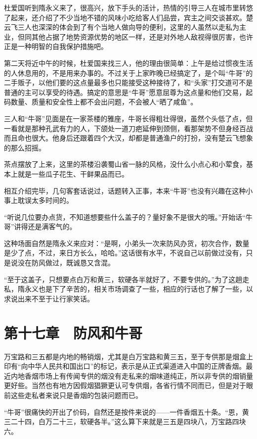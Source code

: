 杜爱国听到隋永义来了，很高兴，放下手头的活计，热情的引导三人在城市里转悠了起来，还介绍了不少当地不错的风味小吃给客人们品尝，宾主之间交谈甚欢。楚云飞三人也深深的体会到了有个当地人做向导的便利，这里的人虽然以走私为主业，但同其他占据了地势资源优势的地区一样，还是对外地人敌视得很厉害，也许正是一种明智的自我保护措施吧。

第二天将近中午的时候，杜爱国来找三人，他的理由很简单：上午是给过惯夜生活的人休息用的，不是用来办事的。不过关于上家昨晚已经搞定了，是个叫“牛哥”的二手贩子，以他们要的这点量最多也只能接受这种接待了，和“头家”打交道可不是普通的主可以享受的待遇。搞定的意思是“牛哥”愿意屈尊为这点量和他们交易，起码数量、质量和安全性上都不会出问题，不会被人“晒了咸鱼”。

三人和“牛哥”见面是在一家茶楼的雅座，牛哥长得粗壮得很，虽然个头低了点，但一看就是那种孔武有力的人，下颌处一道刀疤延伸到颈侧，看那架势不但身经百战而且命也很大。他身后还跟着四个大汉，却都是普通渔户的打扮，没有楚云飞想象的那么招摇。

茶点摆放了上来，这里的茶楼沿袭蜀山省一脉的风格，没什么小点心和小荤食，基本上就是一些瓜子花生、干鲜果品而已。

相互介绍完毕，几句客套话说过，话题转入正事，本来“牛哥”也没有兴趣在这种小事上耽误太多时间的。

“听说几位要办点货，不知道想要些什么盖子的？量好象不是很大的哦。”开始话“牛哥”讲得还是满客气的。

这种场面自然是隋永义来应对：“是啊，小弟头一次来防风办货，初次合作，数量是少了点，不过，来日方长么，哈哈。”这话很有水平，不说自己以前做过没有，只是说没在防风做过，既诚恳又含混。

“至于这盖子，只想要点白万和黄三，软硬各半就好了，不要专供的。”为了这趟走私，隋永义也是下了辛苦的，相关市场调查了一些，相应的行话也了解了一些，以求说出来不至于让行家笑话。

\section{第十七章　防风和牛哥}

万宝路和三五都是内地的畅销烟，尤其是白万宝路和黄三五，至于专供那是烟盒上印有“向中华人民共和国出口”的标记，表示是从正式渠道进入中国的正牌香烟。最近内地香烟市场上有传闻专供的烟没有走私来的烟味道纯正，所以非专供的烟销量更好些。当然也有地方因假烟猖獗更认可专供烟，各省行情不同而已，但是对于眼前这些走私者来说只是香烟的包装问题而已。

“牛哥”很痛快的开出了价码，自然还是按件来说的——一件香烟五十条。“恩，黄三二十四，白万二十三，软硬各半。”这么算下来就是三五是四块八，万宝路四块六。

